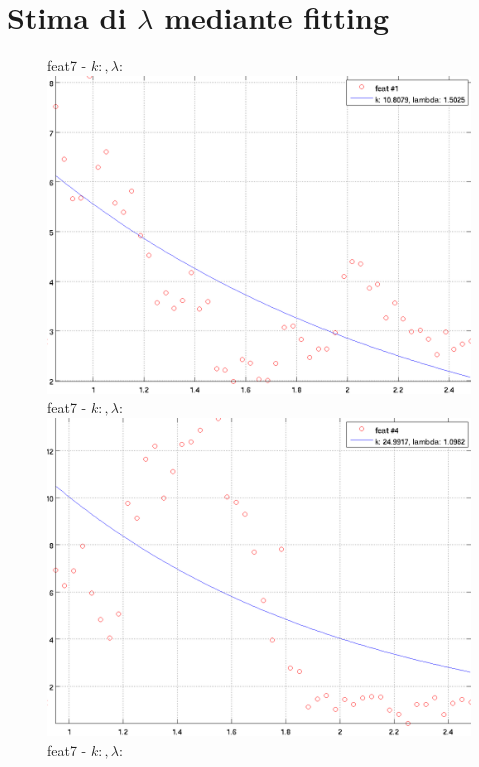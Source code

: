 \documentclass[12pt]{report}
\begin{document}
\section{Stima di $\lambda$ mediante fitting}

\newcommand{\imFeatScale}{0.27}
\newcommand{\imFeatAngle}{0}
\begin{figure}
\begin{minipage}[t]{0.3\linewidth}
	\centering
	feat7 - $k: , \lambda:  $\\
	\includegraphics[scale=\imFeatScale, angle=90]{images/feat1}
	feat7 - $k: , \lambda:  $\\
	\includegraphics[scale=\imFeatScale, angle=90]{images/feat4}
	feat7 - $k: , \lambda:  $\\

\end{minipage}
\end{figure}
\end{document}
